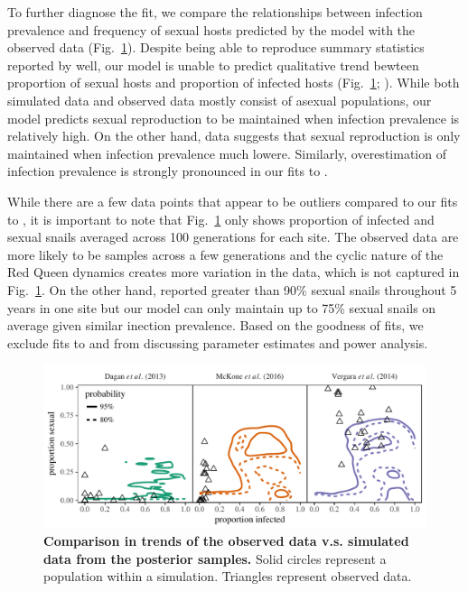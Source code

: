 \documentclass{article}\usepackage[]{graphicx}\usepackage[]{color}
\newcommand{\fref}[1]{Fig.~\ref{fig:#1}}
\begin{document}
To further diagnose the fit, we compare the relationships between infection prevalence and frequency of sexual hosts predicted by the model with the observed data (\fref{ivs}).
Despite being able to reproduce summary statistics reported by \cite{dagan2013clonal} well, 
our model is unable to predict qualitative trend bewteen proportion of sexual hosts and proportion of infected hosts (\fref{ivs}; \cite{dagan2013clonal}).
While both simulated data and observed data mostly consist of asexual populations,
our model predicts sexual reproduction to be maintained when infection prevalence is relatively high. 
On the other hand, \cite{dagan2013clonal} data suggests that sexual reproduction is only maintained when infection prevalence much lowere.
Similarly, overestimation of infection prevalence is strongly pronounced in our fits to \cite{mckone2016fine}.

While there are a few data points that appear to be outliers compared to our fits to \cite{vergara2014infection},
it is important to note that \fref{ivs} only shows proportion of infected and sexual snails averaged across 100 generations for each site.
The observed data are more likely to be samples across a few generations and the cyclic nature of the Red Queen dynamics creates more variation in the data, which is not captured in \fref{ivs}.
On the other hand, \cite{vergara2014infection} reported greater than 90\% sexual snails throughout 5 years in one site but our model can only maintain up to 75\% sexual snails on average given similar inection prevalence.
Based on the goodness of fits, we exclude fits to \cite{dagan2013clonal} and \cite{mckone2016fine} from discussing parameter estimates and power analysis.

\begin{figure}[!ht]
\includegraphics[width=\textwidth]{../fig/simulated_data.pdf}
\caption{{\bf Comparison in trends of the observed data v.s. simulated data from the posterior samples.}
Solid circles represent a population within a simulation. Triangles represent observed data.}
\label{fig:ivs}
\end{figure}
\end{document}
